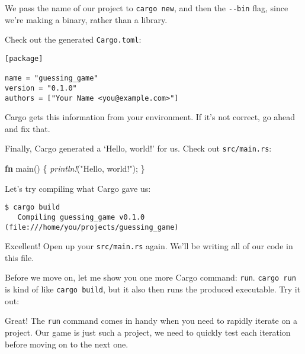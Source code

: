\documentclass[a4paper,]{book}
\newenvironment{Shaded}{\begin{snugshade}}{\end{snugshade}}
\newcommand{\KeywordTok}[1]{\textcolor[rgb]{0.13,0.29,0.53}{\textbf{{#1}}}}
\newcommand{\StringTok}[1]{\textcolor[rgb]{0.31,0.60,0.02}{{#1}}}
\newcommand{\PreprocessorTok}[1]{\textcolor[rgb]{0.56,0.35,0.01}{\textit{{#1}}}}
\newcommand{\NormalTok}[1]{{#1}}
\begin{document}
We pass the name of our project to \texttt{cargo\ new}, and then the
\texttt{-\/-bin} flag, since we're making a binary, rather than a
library.

Check out the generated \texttt{Cargo.toml}:

\begin{verbatim}
[package]

name = "guessing_game"
version = "0.1.0"
authors = ["Your Name <you@example.com>"]
\end{verbatim}

Cargo gets this information from your environment. If it's not correct,
go ahead and fix that.

Finally, Cargo generated a `Hello, world!' for us. Check out
\texttt{src/main.rs}:

\begin{Shaded}
\begin{Highlighting}[]
\KeywordTok{fn} \NormalTok{main() \{}
    \PreprocessorTok{println!}\NormalTok{(}\StringTok{"Hello, world!"}\NormalTok{);}
\NormalTok{\}}
\end{Highlighting}
\end{Shaded}

Let's try compiling what Cargo gave us:

\begin{verbatim}
$ cargo build
   Compiling guessing_game v0.1.0 (file:///home/you/projects/guessing_game)
\end{verbatim}

Excellent! Open up your \texttt{src/main.rs} again. We'll be writing all
of our code in this file.

Before we move on, let me show you one more Cargo command: \texttt{run}.
\texttt{cargo\ run} is kind of like \texttt{cargo\ build}, but it also
then runs the produced executable. Try it out:

\begin{Shaded}
\end{Shaded}

Great! The \texttt{run} command comes in handy when you need to rapidly
iterate on a project. Our game is just such a project, we need to
quickly test each iteration before moving on to the next one.
\end{document}
